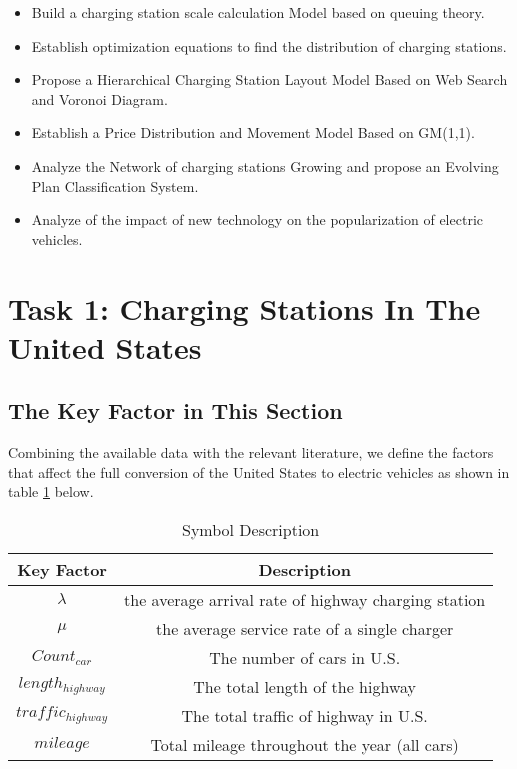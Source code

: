 \documentclass{mcmthesis}
\begin{document}
\begin{itemize}
	\item Build a charging station scale calculation Model based on queuing theory.
	\item Establish optimization equations to find the distribution of charging stations.
	\item Propose a Hierarchical Charging Station Layout Model Based on Web Search and Voronoi Diagram.
	\item Establish a Price Distribution and Movement Model Based on GM(1,1).
	\item Analyze the Network of charging stations Growing and propose an Evolving Plan Classification System.
	\item Analyze of the impact of new technology on the popularization of electric vehicles.
\end{itemize}

\section{Task 1: Charging Stations In The United States}

\subsection{The Key Factor in This Section}
\par Combining the available data with the relevant literature, we define the factors that affect the full conversion of the United States to electric vehicles as shown in table \ref{tab:task1 Symbol Description} below.

\begin{table}[h]
\centering
\caption{Symbol Description}\label{tab:task1 Symbol Description}
\begin{tabular}{cc}
\toprule
Key Factor & Description \\
\midrule
$\lambda$ & the average arrival rate of highway charging station\\
$\mu$ & the average service rate of a single charger\\
$Count_{car}$ & The number of cars in U.S.\\
$length_{highway}$ & The total length of the highway\\
$traffic_{highway}$ & The total traffic of highway in U.S.\\
$mileage$ & Total mileage throughout the year (all cars)\\
\bottomrule
\end{tabular}
\end{table}
\end{document}
